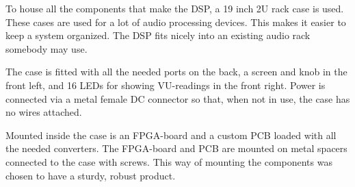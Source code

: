 To house all the components that make the DSP, a 19 inch 2U rack case is used. These cases are used for a lot of audio processing devices. This makes it easier to keep a system organized. The DSP fits nicely into an existing audio rack somebody may use.
\par 
\noindent The case is fitted with all the needed ports on the back, a screen and knob in the front left, and 16 LEDs for showing VU-readings in the front right. Power is connected via a metal female DC connector so that, when not in use, the case has no wires attached. 
\par
\noindent Mounted inside the case is an FPGA-board and a custom PCB loaded with all the needed converters. The FPGA-board and PCB are mounted on metal spacers connected to the case with screws. This way of mounting the components was chosen to have a sturdy, robust product.